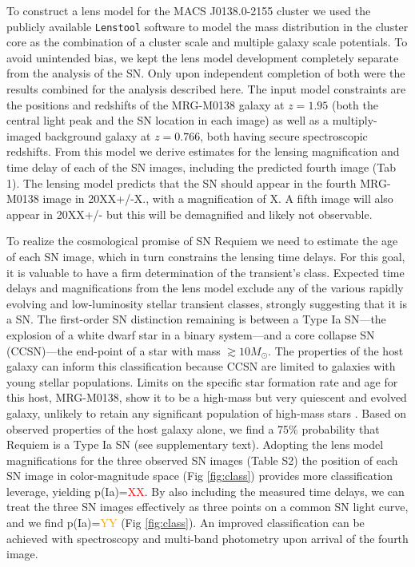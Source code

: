 \documentclass[12pt,dvipsnames]{article}
\begin{document}
To construct a lens model for the MACS J0138.0-2155 cluster we used the publicly available {\tt Lenstool} software \cite{jullo_bayesian_2007, kneib_lenstool_2011} to model the mass distribution in the cluster core as the combination of a cluster scale and multiple galaxy scale potentials.  To avoid unintended bias, we kept the lens model development completely separate from the analysis of the SN.  Only upon independent completion of both were the results combined for the analysis described here.  The input model constraints are the positions and redshifts of the MRG-M0138 galaxy at $z=1.95$ (both the central light peak and the SN location in each image) as well as a multiply-imaged background 
galaxy at $z=0.766$, both having secure spectroscopic redshifts.  
From this model we derive estimates for the lensing magnification and time delay of each of the SN images, including the predicted fourth image (Tab 1).
The lensing model predicts that the SN should appear in the fourth MRG-M0138 image in 20XX+/-X., with a magnification of X. A fifth image will also appear in 20XX+/- but this will be demagnified and likely not observable.

To realize the cosmological promise of SN Requiem 
we need to estimate the age of each SN image, which in turn constrains the lensing time delays. For this
goal, it is valuable to have a firm determination of the transient’s class. Expected time delays and magnifications from the lens model exclude any of the various rapidly evolving and low-luminosity stellar transient classes, strongly suggesting that it is a SN. The first-order SN distinction remaining is between a Type Ia SN---the explosion of a white dwarf star in a binary system---and a core collapse SN (CCSN)---the end-point of a star with mass $\gtrsim 10 M_{\odot}$. 
The properties of the host galaxy can inform this classification because CCSN are limited to galaxies with young stellar populations. Limits on the specific star formation rate and age for this host, MRG-M0138, show it to be a high-mass but very quiescent and evolved galaxy, %
unlikely to retain any significant population of high-mass stars \cite{newman_resolving_2018}. Based on observed properties of the host galaxy alone, we find a 75\% probability that Requiem is a Type Ia SN (see supplementary text). Adopting the lens model magnifications for the three observed SN images (Table S2) the position of each SN image in color-magnitude space (Fig \ref{fig:class}) provides more classification leverage, yielding p(Ia)=\textcolor{red}{XX}. By also including the measured time delays, we can treat the three SN images effectively as three points on a common SN light curve, and we find p(Ia)=\textcolor{Orange}{YY} (Fig \ref{fig:class}).
An improved classification can be achieved with spectroscopy and multi-band photometry upon arrival of the fourth image.
\end{document}

